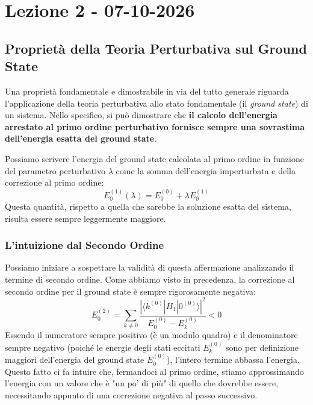 \chapter{Lezione 2 - 07-10-2026}

\section{Proprietà della Teoria Perturbativa sul Ground State}

Una proprietà fondamentale e dimostrabile in via del tutto generale riguarda l'applicazione della teoria perturbativa allo stato fondamentale (il \textit{ground state}) di un sistema. Nello specifico, si può dimostrare che \textbf{il calcolo dell'energia arrestato al primo ordine perturbativo fornisce sempre una sovrastima dell'energia esatta del ground state}.

Possiamo scrivere l'energia del ground state calcolata al primo ordine in funzione del parametro perturbativo $\lambda$ come la somma dell'energia imperturbata e della correzione al primo ordine:
\begin{equation}
E_0^{(1)}(\lambda) = E_0^{(0)} + \lambda E_0^{(1)}
\end{equation}
Questa quantità, rispetto a quella che sarebbe la soluzione esatta del sistema, risulta essere sempre leggermente maggiore.

\subsection{L'intuizione dal Secondo Ordine}
Possiamo iniziare a sospettare la validità di questa affermazione analizzando il termine di secondo ordine. Come abbiamo visto in precedenza, la correzione al secondo ordine per il ground state è sempre rigorosamente negativa:
\begin{equation}
E_0^{(2)} = \sum_{k \neq 0} \frac{|\langle k^{(0)} | H_1 | 0^{(0)} \rangle|^2}{E_0^{(0)} - E_k^{(0)}} < 0
\end{equation}
Essendo il numeratore sempre positivo (è un modulo quadro) e il denominatore sempre negativo (poiché le energie degli stati eccitati $E_k^{(0)}$ sono per definizione maggiori dell'energia del ground state $E_0^{(0)}$), l'intero termine abbassa l'energia. Questo fatto ci fa intuire che, fermandoci al primo ordine, stiamo approssimando l'energia con un valore che è "un po' di più" di quello che dovrebbe essere, necessitando appunto di una correzione negativa al passo successivo.

